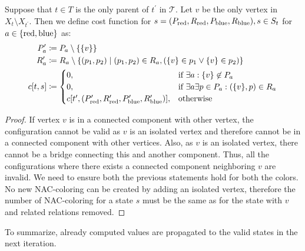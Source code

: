 Suppose that \( t \in T \) is
the only parent of \( t^\prime\) in \( \mathcal {T} \).
Let \( v \) be the only vertex in \( X_t \setminus X_{t^\prime} \).
Then we define cost function for \( s=(P_{\text{red}}, R_{\text{red}}, P_{\text{blue}}, R_{\text{blue}}), s \in S_t \)
for \( a \in \{\text{red}, \text{blue}\} \) as:
%
\begin{align*}
	P_a^\prime & \coloneqq P_a \setminus \{\{v\}\}                                                                                             \\
	R_a^\prime & \coloneqq R_a \setminus \{ (p_1, p_2) \mid (p_1, p_2) \in R_a, (\{v\} \in p_1 \lor \{v\} \in p_2) \}                          \\
	c[t, s]    & \coloneqq
	\begin{cases}
		0,                                                                           & \text{if } \exists a : \{v\} \not\in P_a                    \\
		0,                                                                           & \text{if } \exists a \exists p \in P_a : (\{v\}, p) \in R_a \\
		c[t^\prime, (P_{\text{red}}^\prime, R_{\text{red}}^\prime, P_{\text{blue}}^\prime, R_{\text{blue}}^\prime)], & \text{otherwise}
	\end{cases} \\
\end{align*}
%
%
\begin{proof}
	If vertex \( v \) is in a connected component with other vertex,
	the configuration cannot be valid as \( v \) is an isolated vertex
	and therefore cannot be in a connected component with other vertices.
	Also, as \( v \) is an isolated vertex, there cannot be a bridge
	connecting this and another component.
	Thus, all the configurations where there exists
	a connected component neighboring \( v \) are invalid.
	We need to ensure both the previous statements hold for both the colors.
	No new NAC-coloring can be created by adding an isolated vertex,
	therefore the number of NAC-coloring for a state \( s \) must be the same
	as for the state with \( v \) and related relations removed.
\end{proof}
%
To summarize, already computed values are propagated to the valid states in the next iteration.

\subsection{\ForgetVertexNode}

